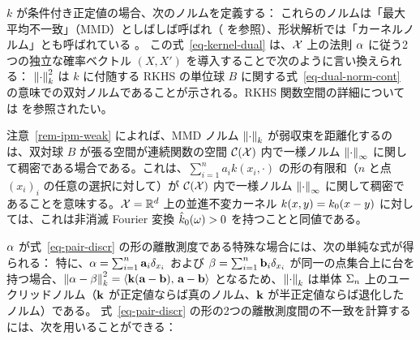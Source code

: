$k$ が条件付き正定値の場合、次のノルムを定義する：
これらのノルムは「最大平均不一致」（MMD）としばしば呼ばれ（\citep{gretton2007kernel} を参照）、形状解析では「カーネルノルム」とも呼ばれている \citep{glaunes2004diffeomorphic}。
%
この式~\eqref{eq-kernel-dual} は、$\mathcal{X}$ 上の法則 $\alpha$ に従う2つの独立な確率ベクトル $(X,X')$ を導入することで次のように言い換えられる：
$\left\| \cdot \right\|^2_{k}$ は $k$ に付随する RKHS の単位球 $B$ に関する式~\eqref{eq-dual-norm-cont} の意味での双対ノルムであることが示される。RKHS 関数空間の詳細については \citep{berlinet03reproducing,Hofmann2008,scholkopf2002learning} を参照されたい。

\begin{rem}[普遍カーネル]
注意~\ref{rem-ipm-weak} によれば、MMD ノルム $\left\| \cdot \right\|_k$ が弱収束を距離化するのは、双対球 $B$ が張る空間が連続関数の空間 $\mathcal{C}(\mathcal{X})$ 内で一様ノルム $\left\| \cdot \right\|_\infty$ に関して稠密である場合である。これは、$\sum_{i=1}^n a_i k(x_i,\cdot)$ の形の有限和（$n$ と点 $(x_i)_i$ の任意の選択に対して）が $\mathcal{C}(\mathcal{X})$ 内で一様ノルム $\left\| \cdot \right\|_\infty$ に関して稠密であることを意味する。$\mathcal{X}=\mathbb{R}^d$ 上の並進不変カーネル $k(x,y)=k_0(x-y)$ に対しては、これは非消滅 Fourier 変換 $\hat {k}_0(\omega) >0$ を持つことと同値である。
\end{rem}

$\alpha$ が式~\eqref{eq-pair-discr} の形の離散測度である特殊な場合には、次の単純な式が得られる：
特に、$\alpha=\sum_{i=1}^n \mathrm{\textbf{a}}_i \delta_{x_i}$ および $\beta=\sum_{i=1}^n \mathrm{\textbf{b}}_i \delta_{x_i}$ が同一の点集合上に台を持つ場合、$\left\| \alpha-\beta \right\|_{k}^2 = \langle \mathrm{\textbf{k}}(\mathrm{\textbf{a}}-\mathrm{\textbf{b}}),\,\mathrm{\textbf{a}}-\mathrm{\textbf{b}}\rangle$ となるため、$\left\| \cdot \right\|_{k}$ は単体 $\Sigma_n$ 上のユークリッドノルム（$\mathrm{\textbf{k}}$ が正定値ならば真のノルム、$\mathrm{\textbf{k}}$ が半正定値ならば退化したノルム）である。
%
式~\eqref{eq-pair-discr} の形の2つの離散測度間の不一致を計算するには、次を用いることができる：


